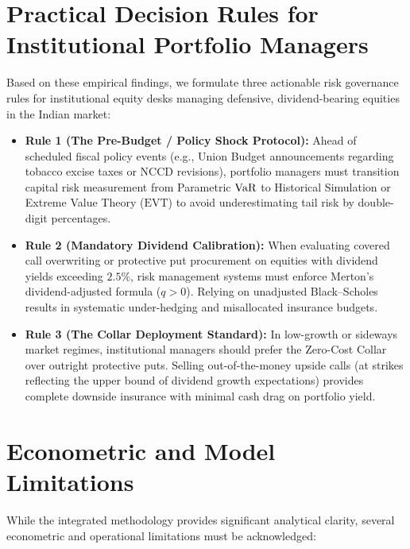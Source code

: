 \section{Practical Decision Rules for Institutional Portfolio Managers}
\label{sec:decision_rules}

Based on these empirical findings, we formulate three actionable risk governance rules for institutional equity desks managing defensive, dividend-bearing equities in the Indian market:
\begin{itemize}
    \item \textbf{Rule 1 (The Pre-Budget / Policy Shock Protocol):} Ahead of scheduled fiscal policy events (e.g., Union Budget announcements regarding tobacco excise taxes or NCCD revisions), portfolio managers must transition capital risk measurement from Parametric $\operatorname{VaR}$ to Historical Simulation or Extreme Value Theory ($\text{EVT}$) to avoid underestimating tail risk by double-digit percentages.
    \item \textbf{Rule 2 (Mandatory Dividend Calibration):} When evaluating covered call overwriting or protective put procurement on equities with dividend yields exceeding $2.5\%$, risk management systems must enforce Merton's dividend-adjusted formula ($q > 0$). Relying on unadjusted Black--Scholes results in systematic under-hedging and misallocated insurance budgets.
    \item \textbf{Rule 3 (The Collar Deployment Standard):} In low-growth or sideways market regimes, institutional managers should prefer the Zero-Cost Collar over outright protective puts. Selling out-of-the-money upside calls (at strikes reflecting the upper bound of dividend growth expectations) provides complete downside insurance with minimal cash drag on portfolio yield.
\end{itemize}

\section{Econometric and Model Limitations}
\label{sec:limitations}

While the integrated methodology provides significant analytical clarity, several econometric and operational limitations must be acknowledged:


